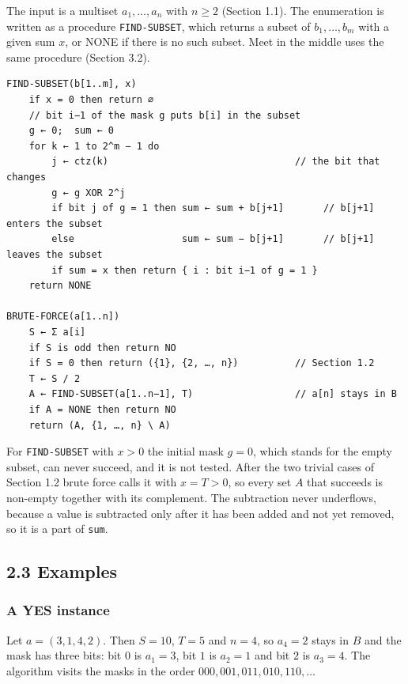 \documentclass[
]{article}
\begin{document}
The input is a multiset \(a_1, \dots, a_n\) with \(n \ge 2\) (Section
1.1). The enumeration is written as a procedure \texttt{FIND-SUBSET},
which returns a subset of \(b_1, \dots, b_m\) with a given sum \(x\), or
NONE if there is no such subset. Meet in the middle uses the same
procedure (Section 3.2).

\begin{verbatim}
FIND-SUBSET(b[1..m], x)
    if x = 0 then return ∅
    // bit i−1 of the mask g puts b[i] in the subset
    g ← 0;  sum ← 0
    for k ← 1 to 2^m − 1 do
        j ← ctz(k)                                 // the bit that changes
        g ← g XOR 2^j
        if bit j of g = 1 then sum ← sum + b[j+1]       // b[j+1] enters the subset
        else                   sum ← sum − b[j+1]       // b[j+1] leaves the subset
        if sum = x then return { i : bit i−1 of g = 1 }
    return NONE

BRUTE-FORCE(a[1..n])
    S ← Σ a[i]
    if S is odd then return NO
    if S = 0 then return ({1}, {2, …, n})          // Section 1.2
    T ← S / 2
    A ← FIND-SUBSET(a[1..n−1], T)                  // a[n] stays in B
    if A = NONE then return NO
    return (A, {1, …, n} \ A)
\end{verbatim}

For \texttt{FIND-SUBSET} with \(x > 0\) the initial mask \(g = 0\),
which stands for the empty subset, can never succeed, and it is not
tested. After the two trivial cases of Section 1.2 brute force calls it
with \(x = T > 0\), so every set \(A\) that succeeds is non-empty
together with its complement. The subtraction never underflows, because
a value is subtracted only after it has been added and not yet removed,
so it is a part of \texttt{sum}.

\hypertarget{examples}{%
\subsection{2.3 Examples}\label{examples}}

\hypertarget{a-yes-instance}{%
\subsubsection{A YES instance}\label{a-yes-instance}}

Let \(a = (3, 1, 4, 2)\). Then \(S = 10\), \(T = 5\) and \(n = 4\), so
\(a_4 = 2\) stays in \(B\) and the mask has three bits: bit \(0\) is
\(a_1 = 3\), bit \(1\) is \(a_2 = 1\) and bit \(2\) is \(a_3 = 4\). The
algorithm visits the masks in the order
\(000, 001, 011, 010, 110, \dots\)
\end{document}
